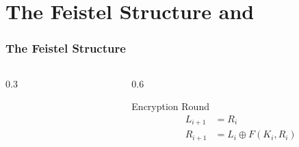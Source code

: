 \documentclass{cubeamer}
\begin{document}
\section{The Feistel Structure and }
\begin{frame}
    \frametitle{The Feistel Structure}
    \begin{columns}[c] %
        \begin{column}{0.3\textwidth}
            \feisteldiagram %
        \end{column}

        \begin{column}{0.6\textwidth}
            \begin{block}{Encryption Round}
                \begin{align*}
                    L_{i+1} &= R_i \\
                    R_{i+1} &= L_i \oplus F(K_{i}, R_i)
                \end{align*}
            \end{block}
        \end{column}
    \end{columns}
\end{frame}
\end{document}
